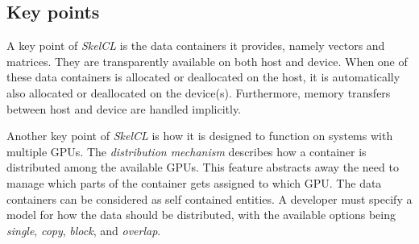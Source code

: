 \subsection{Key points}
A key point of \textit{SkelCL} is the data containers it provides, namely vectors and matrices. They are transparently available on both host and device. When one of these data containers is allocated or deallocated on the host, it is automatically also allocated or deallocated on the device(s). Furthermore, memory transfers between host and device are handled implicitly.

Another key point of \textit{SkelCL} is how it is designed to function on systems with multiple GPUs. The \textit{distribution mechanism} describes how a container is distributed among the available GPUs. This feature abstracts away the need to manage which parts of the container gets assigned to which GPU. The data containers can be considered as self contained entities. A developer must specify a model for how the data should be distributed, with the available options being \textit{single}, \textit{copy}, \textit{block}, and \textit{overlap}.
